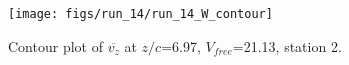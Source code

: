 \begin{figure}[H]
\centering
\texttt{[image: figs/run\_14/run\_14\_W\_contour]}
\caption{Contour plot of $\overline{v_{z}}$ at $z/c$=6.97, $V_{free}$=21.13, station 2.}
\label{fig:run_14_W_contour}
\end{figure}


